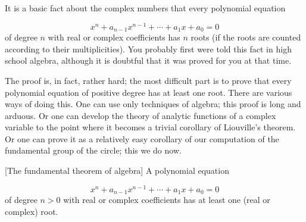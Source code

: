 It is a basic fact about the complex numbers that every polynomial equation

\[
x^{n} + a_{n - 1}x^{n - 1} + \cdots + a_{1}x + a_{0} = 0
\]
of degree \(n\) with real or complex coefficients has \(n\) roots (if the roots are counted according to their multiplicities). You probably first were told this fact in high school algebra, although it is doubtful that it was proved for you at that time.

The proof is, in fact, rather hard; the most difficult part is to prove that every polynomial equation of positive degree has at least one root. There are various ways of doing this. One can use only techniques of algebra; this proof is long and arduous. Or one can develop the theory of analytic functions of a complex variable to the point where it becomes a trivial corollary of Liouville's theorem. Or one can prove it as a relatively easy corollary of our computation of the fundamental group of the circle; this we do now.

\begin{theorem}
\label{thm:\thetheorem}[The fundamental theorem of algebra]
A polynomial equation

\[
x^{n} + a_{n - 1}x^{n - 1} + \cdots + a_{1}x + a_{0} = 0
\]
of degree \(n > 0\) with real or complex coefficients has at least one (real or complex) root.
\end{theorem}

